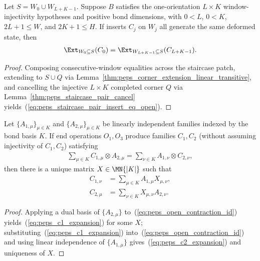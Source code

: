 \begin{lemma}
    \label{thm:peps_staircase_pair_insert_eq_open}
    \leanok
    Let $S=W_0\cup W_{L+K-1}$. Suppose $B$ satisfies the one-orientation
    $L\times K$ window-injectivity hypotheses and positive bond dimensions,
    with $0<L$, $0<K$, $2L+1\le W$, and $2K+1\le H$. If inserts $C_j$ on $W_j$ all generate the same deformed state,
    then
    \begin{align}
        \Ext_{W_0\subseteq S}(C_0)
        =
        \Ext_{W_{L+K-1}\subseteq S}(C_{L+K-1}).
        \label{eq:peps_staircase_pair_insert_eq_open}
    \end{align}
\end{lemma}
\begin{proof}\leanok
    Composing consecutive-window equalities across the staircase patch,
    extending to $S\cup Q$ via Lemma~\ref{thm:peps_corner_extension_linear_transitive},
    and cancelling the injective $L\times K$ completed corner $Q$ via
    Lemma~\ref{thm:peps_staircase_pair_cancel} yields~(\ref{eq:peps_staircase_pair_insert_eq_open}).
\end{proof}

\begin{lemma}
    \label{thm:peps_existsUnique_virtualOperation_of_endPair}
    \leanok
    Let $\{A_{1,\mu}\}_{\mu\in K}$ and $\{A_{2,\mu}\}_{\mu\in K}$ be linearly
    independent families indexed by the bond basis $K$. If end operations
    $O_1,O_3$ produce families $C_1,C_2$ (without assuming injectivity of
    $C_1,C_2$) satisfying
    \begin{align}
        \sum_{\mu\in K} C_{1,\mu}\otimes A_{2,\mu}
        =
        \sum_{\nu\in K} A_{1,\nu}\otimes C_{2,\nu},
        \label{eq:peps_open_contraction_id}
    \end{align}
    then there is a unique matrix $X\in\MN{|K|}$ such that
    \cite[Lemma~5]{Molnar2018NormalPEPS}
    \begin{align}
        C_{1,\nu}
         & =\sum_{\mu\in K} A_{1,\mu}X_{\mu,\nu},
        \label{eq:peps_c1_expansion}              \\
        C_{2,\mu}
         & =\sum_{\nu\in K} X_{\mu,\nu}A_{2,\nu}.
        \label{eq:peps_c2_expansion}
    \end{align}
\end{lemma}
\begin{proof}\leanok
    Applying a dual basis of $\{A_{2,\mu}\}$ to~(\ref{eq:peps_open_contraction_id})
    yields~(\ref{eq:peps_c1_expansion}) for some $X$; substituting~(\ref{eq:peps_c1_expansion})
    into~(\ref{eq:peps_open_contraction_id}) and using linear independence of
    $\{A_{1,\mu}\}$ gives~(\ref{eq:peps_c2_expansion}) and uniqueness of $X$.
\end{proof}


